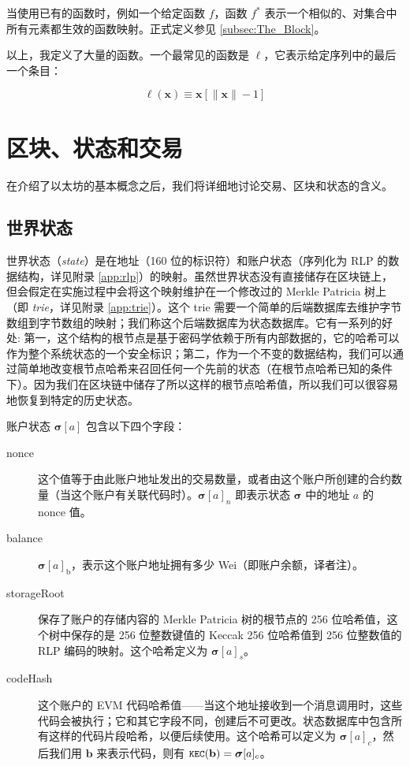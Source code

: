 \documentclass[9pt,oneside]{amsart}
\makeatletter
\newcommand{\linkdest}[1]{\Hy@raisedlink{\hypertarget{#1}{}}}
\makeatother
\begin{document}
\begin{multicols}{2}
当使用已有的函数时，例如一个给定函数 $f$，函数 \hyperlink{general_element_wise_sequence_transformation_f_pow_asterisk}{$f^*$} 表示一个相似的、对集合中所有元素都生效的函数映射。正式定义参见 \hyperlink{block}{\ref{subsec:The_Block}}。

以上，我定义了大量的函数。\linkdest{ell}一个最常见的函数是 $\ell$，它表示给定序列中的最后一个条目：

\begin{equation}
\ell(\mathbf{x}) \equiv \mathbf{x}[\lVert \mathbf{x} \rVert - 1]
\end{equation}

\section{区块、状态和交易} \label{ch:bst}

在介绍了以太坊的基本概念之后，我们将详细地讨论交易、区块和状态的含义。

\subsection{世界状态} \label{ch:state}

世界状态（\textit{state}）是在地址（160 位的标识符）和账户状态（序列化为 RLP 的数据结构，详见附录 \ref{app:rlp}）的映射。虽然世界状态没有直接储存在区块链上，但会假定在实施过程中会将这个映射维护在一个修改过的 Merkle Patricia 树上（即 \textit{trie}，详见附录 \ref{app:trie}）。这个 trie 需要一个简单的后端数据库去维护字节数组到字节数组的映射；我们称这个后端数据库为状态数据库。它有一系列的好处: 第一，这个结构的根节点是基于密码学依赖于所有内部数据的，它的哈希可以作为整个系统状态的一个安全标识；第二，作为一个不变的数据结构，我们可以通过简单地改变根节点哈希来召回任何一个先前的状态（在根节点哈希已知的条件下）。因为我们在区块链中储存了所以这样的根节点哈希值，所以我们可以很容易地恢复到特定的历史状态。

账户状态 $\boldsymbol{\sigma}[a]$ 包含以下四个字段：

\begin{description}
\item[nonce] \linkdest{account_nonce}这个值等于由此账户地址发出的交易数量，或者由这个账户所创建的合约数量（当这个账户有关联代码时）。$\boldsymbol{\sigma}[a]_n$ 即表示状态 $\boldsymbol{\sigma}$ 中的地址 $a$ 的 nonce 值。
\item[balance] $\boldsymbol{\sigma}[a]_{\mathrm{b}}$，表示这个账户地址拥有多少 Wei（即账户余额，译者注）。
\item[storageRoot] 保存了账户的存储内容的 Merkle Patricia 树的根节点的 256 位哈希值，这个树中保存的是 256 位整数键值的 Keccak 256 位哈希值到 256 位整数值的 RLP 编码的映射。这个哈希定义为 $\boldsymbol{\sigma}[a]_s$。
\item[codeHash] 这个账户的 EVM 代码哈希值——当这个地址接收到一个消息调用时，这些代码会被执行；它和其它字段不同，创建后不可更改。状态数据库中包含所有这样的代码片段哈希，以便后续使用。这个哈希可以定义为 $\boldsymbol{\sigma}[a]_c$，然后我们用 $\mathbf{b}$ 来表示代码，则有 $\texttt{\small KEC}(\mathbf{b}) = \boldsymbol{\sigma}[a]_c$。
\end{description}


\end{multicols}
\end{document}
